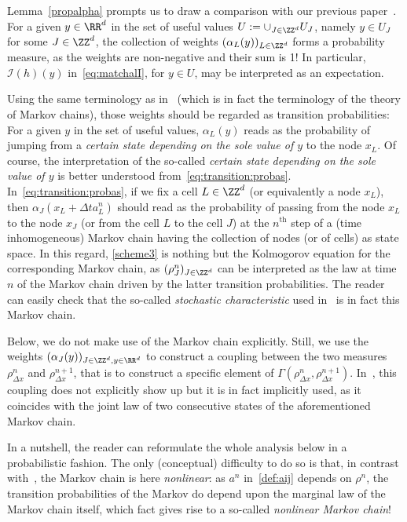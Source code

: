 \begin{rema}\label{comparison}
Lemma~\ref{propalpha} prompts us to draw a comparison with our previous paper~\cite{DLV}. For a given $y \in \RR^d$ in the set of useful values $U:=\cup_{J \in \ZZ^d} U_{J}$, namely $y \in U_{J}$ for some $J \in \ZZ^d$, the collection of weights $(\alpha_{L}(y))_{L \in \ZZ^d}$ forms a probability measure, as the weights are non-negative and their sum is 1! In particular, ${\mathcal I}(h)(y)$ in~\eqref{eq:matchalI}, for $y \in U$, may be interpreted as an expectation.

Using the same terminology as in~\cite{DLV} (which is in fact the terminology of the theory of Markov chains), those weights should be regarded as transition probabilities: For a given $y$ in the set of useful values, $\alpha_{L}(y)$ reads as the probability of jumping from a \emph{certain state depending on the sole value of $y$} to the node $x_{L}$. Of course, the interpretation of the so-called \emph{certain state depending on the sole value of $y$} is better understood from~\eqref{eq:transition:probas}. In~\eqref{eq:transition:probas}, if we fix a cell $L \in \ZZ^d$ (or equivalently a node $x_{L}$), then $\alpha_{J}(x_{L}+\Delta t a^n_{L})$ should read as the probability of passing from the node $x_{L}$ to the node $x_{J}$ (or from the cell $L$ to the cell $J$) at the $n^{\textrm{th}}$ step of a (time inhomogeneous) Markov chain having the collection of nodes (or of cells) as state space. In this regard, \eqref{scheme3} is nothing but the Kolmogorov equation for the corresponding Markov chain, as $(\rho^n_{J})_{J \in \ZZ^d}$ can be interpreted as the law at time $n$ of the Markov chain driven by the latter transition probabilities. The reader can easily check that the so-called \emph{stochastic characteristic} used in~\cite{DLV} is in fact this Markov chain.

Below, we do not make use of the Markov chain explicitly. Still, we use the weights $(\alpha_{J}(y))_{J \in \ZZ^d, y \in \RR^d}$ to construct a coupling between the two measures $\rho^n_{\Delta x}$ and $\rho^{n+1}_{\Delta x}$, that is to construct a specific element of $\Gamma(\rho^n_{\Delta x},\rho^{n+1}_{\Delta x})$. In~\cite{DLV}, this coupling does not explicitly show up but it is in fact implicitly used, as it coincides with the joint law of two consecutive states of the aforementioned Markov chain.

In a nutshell, the reader can reformulate the whole analysis below in a probabilistic fashion. The only (conceptual) difficulty to do so is that, in contrast with~\cite{DLV}, the Markov chain is here \emph{nonlinear}: as $a^n$ in~\eqref{def:aij} depends on $\rho^n$, the transition probabilities of the Markov do depend upon the marginal law of the Markov chain itself, which fact gives rise to a so-called \emph{nonlinear Markov chain}!
\end{rema}


